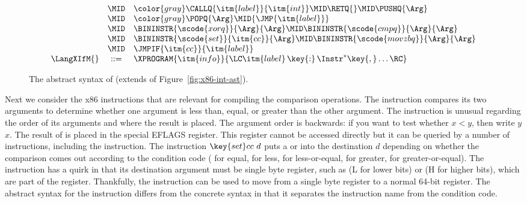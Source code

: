 \documentclass[7x10,nocrop]{TimesAPriori_MIT}%
\newcommand{\gray}[1]{{\color{gray} #1}}
\def\racketEd{0}
\def\pythonEd{1}
\def\edition{0}
\newcommand{\racket}[1]{{\if\edition\racketEd{#1}\fi}}
\newcommand{\python}[1]{{\if\edition\pythonEd #1\fi}}
\begin{document}
\begin{figure}[tp]
{\begin{minipage}{0.98\textwidth}
{\[\begin{array}{lcl}
       &\MID& \gray{ \CALLQ{\itm{label}}{\itm{int}} \MID \RETQ{} 
       \MID \PUSHQ{\Arg}} \\
       &\MID& \gray{ \POPQ{\Arg} \MID \racket{\JMP{\itm{label}}} } \python{\JMP{\itm{label}}}\\
       &\MID& \BININSTR{\scode{xorq}}{\Arg}{\Arg}
       \MID \BININSTR{\scode{cmpq}}{\Arg}{\Arg}\\
       &\MID& \BININSTR{\scode{set}}{\itm{cc}}{\Arg} 
       \MID \BININSTR{\scode{movzbq}}{\Arg}{\Arg}\\
       &\MID&  \JMPIF{\itm{cc}}{\itm{label}} \\
\LangXIfM{} &::= & \XPROGRAM{\itm{info}}{\LC\itm{label} \,\key{:}\, \Instr^{*} \key{,} \ldots \RC }
\end{array}
\]
\fi}
\end{minipage}
}
\caption{The abstract syntax of \LangXIf{} (extends \LangXInt{} of Figure~\ref{fig:x86-int-ast}).}
\label{fig:x86-1}
\end{figure}

Next we consider the x86 instructions that are relevant for compiling
the comparison operations. The  instruction compares its two
arguments to determine whether one argument is less than, equal, or
greater than the other argument. The  instruction is unusual
regarding the order of its arguments and where the result is
placed. The argument order is backwards: if you want to test whether
$x < y$, then write  $y$\code{,} $x$. The result of
 is placed in the special EFLAGS register. This register
cannot be accessed directly but it can be queried by a number of
instructions, including the  instruction. The instruction
$\key{set}cc~d$ puts a  or  into the destination $d$
depending on whether the comparison comes out according to the
condition code  ( for equal,  for less, 
for less-or-equal,  for greater,  for
greater-or-equal).  The  instruction has a quirk in
that its destination argument must be single byte register, such as
 (L for lower bits) or  (H for higher bits), which
are part of the  register.  Thankfully, the 
instruction can be used to move from a single byte register to a
normal 64-bit register.  The abstract syntax for the 
instruction differs from the concrete syntax in that it separates the
instruction name from the condition code.
\end{document}
